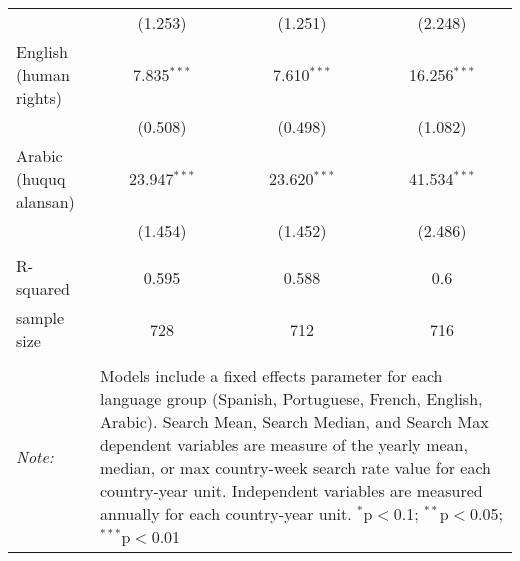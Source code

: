 \begin{table}[!htbp]
\begin{tabular}{@{\extracolsep{5pt}}lccc}
  & (1.253) & (1.251) & (2.248) \\ 
  English (human rights) & 7.835$^{***}$ & 7.610$^{***}$ & 16.256$^{***}$ \\ 
  & (0.508) & (0.498) & (1.082) \\ 
  Arabic (huquq alansan) & 23.947$^{***}$ & 23.620$^{***}$ & 41.534$^{***}$ \\ 
  & (1.454) & (1.452) & (2.486) \\ 
 \hline \\[-1.8ex] 
R-squared  & 0.595 & 0.588 & 0.6 \\ 
sample size  & 728 & 712 & 716 \\ 
\hline 
\hline \\[-1.8ex] 
\textit{Note:}  & \multicolumn{3}{l}{\parbox[t]{8cm}{Models include a fixed effects parameter for each language group (Spanish, Portuguese, French, English, Arabic). Search Mean, Search Median, and Search Max dependent variables are measure of the yearly mean, median, or max country-week search rate value for each country-year unit. Independent variables are measured annually for each country-year unit. $^{*}$p$<$0.1; $^{**}$p$<$0.05; $^{***}$p$<$0.01}} \\ 
\end{tabular} 
\end{table} 
